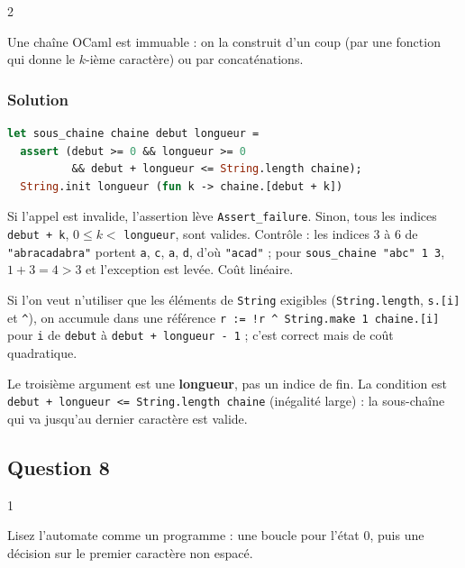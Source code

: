 \documentclass[11pt,a4paper]{article}
\begin{document}
\begin{indication}{2}

Une chaîne OCaml est immuable : on la construit d'un coup (par une fonction qui donne le \(k\)-ième caractère) ou par concaténations.

\end{indication}

\hypertarget{solution-6}{%
\subsubsection{Solution}\label{solution-6}}

\begin{lstlisting}[language=Caml]
let sous_chaine chaine debut longueur =
  assert (debut >= 0 && longueur >= 0
          && debut + longueur <= String.length chaine);
  String.init longueur (fun k -> chaine.[debut + k])
\end{lstlisting}

Si l'appel est invalide, l'assertion lève \texttt{Assert\_failure}. Sinon, tous les indices \texttt{debut\ +\ k}, \(0\le k<\) \texttt{longueur}, sont valides. Contrôle : les indices 3 à 6 de \texttt{"abracadabra"} portent \texttt{a}, \texttt{c}, \texttt{a}, \texttt{d}, d'où \texttt{"acad"} ; pour \texttt{sous\_chaine\ "abc"\ 1\ 3}, \(1+3=4>3\) et l'exception est levée. Coût linéaire.

Si l'on veut n'utiliser que les éléments de \texttt{String} exigibles (\texttt{String.length}, \texttt{s.{[}i{]}} et \texttt{\^{}}), on accumule dans une référence \texttt{r\ :\allowbreak{}=\allowbreak{}\ !r\ \^{}\ String.make\ 1\ chaine.{[}i{]}\allowbreak{}} pour \texttt{i} de \texttt{debut} à \texttt{debut\ +\ longueur\ -\ 1} ; c'est correct mais de coût quadratique.

\begin{piege}

Le troisième argument est une \textbf{longueur}, pas un indice de fin. La condition est \texttt{debut\ +\ longueur\ \textless{}=\allowbreak{}\ String.length\ chaine} (inégalité large) : la sous-chaîne qui va jusqu'au dernier caractère est valide.

\end{piege}

\hypertarget{question-8}{%
\subsection{Question 8}\label{question-8}}

\begin{indication}{1}

Lisez l'automate comme un programme : une boucle pour l'état 0, puis une décision sur le premier caractère non espacé.

\end{indication}
\end{document}
